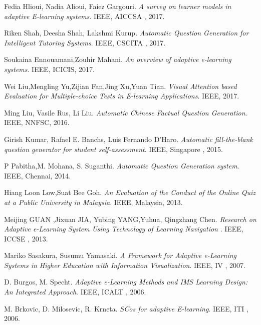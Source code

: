 \begin{thebibliography}{9}
		
	Fedia Hlioui, Nadia Alioui, Faiez Gargouri. 
	\textit{A survey on learner models in adaptive E-learning systems}.
	IEEE, AICCSA , 2017.
	
	Riken Shah, Deesha Shah, Lakshmi Kurup. 
	\textit{Automatic Question Generation for Intelligent
		Tutoring Systems}.
	IEEE, CSCITA , 2017.
	
	Soukaina Ennouamani,Zouhir Mahani. 
	\textit{An overview of adaptive e-learning systems}. 
	IEEE, ICICIS, 2017.
	
	Wei Liu,Mengling Yu,Zijian Fan,Jing Xu,Yuan Tian. 
	\textit{Visual Attention based Evaluation for Multiple-choice Tests in E-learning Applications}. 
	IEEE, 2017.
	
	Ming Liu, Vasile Rus, Li Liu. 
	\textit{Automatic Chinese Factual Question Generation}. IEEE, NNFSC, 2016.
	
	Girish Kumar, Rafael E. Banchs, Luis Fernando D'Haro. 
	\textit{Automatic fill-the-blank question generator for student self-assessment}.
	IEEE, Singapore , 2015.
	
	P Pabitha,M. Mohana, S. Suganthi. 
	\textit{Automatic Question Generation system}. 
	IEEE, Chennai, 2014.
	
	Hiang Loon Low,Suat Bee Goh. 
	\textit{An Evaluation of the Conduct of the Online Quiz at a Public University in Malaysia}. 
	IEEE, Malaysia, 2013.
	
	Meijing GUAN ,Jixuan JIA, Yubing YANG,Yuhua, Qingzhang Chen. 
	\textit{Research on Adaptive e-Learning System Using
	Technology of Learning Navigation }.
	IEEE, ICCSE , 2013.
	
	Mariko Sasakura, Susumu Yamasaki. 
	\textit{A Framework for Adaptive e-Learning Systems in Higher Education with Information Visualization}.
	IEEE, IV , 2007.
	
	D. Burgos, M. Specht. 
	\textit{Adaptive e-Learning Methods and IMS Learning Design: An Integrated Approach}.
	IEEE, ICALT , 2006.
	
	M. Brkovic, D. Milosevic, R. Krneta. 
	\textit{SCos for adaptive E-learning}.
	IEEE, ITI , 2006.
\end{thebibliography}

%
%
%
\clearpage
%
%
%
%
%
%
%
